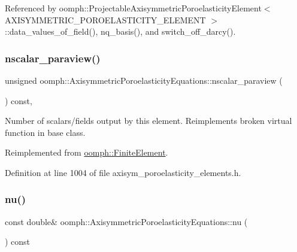 Referenced by oomph\+::\+Projectable\+Axisymmetric\+Poroelasticity\+Element$<$ A\+X\+I\+S\+Y\+M\+M\+E\+T\+R\+I\+C\+\_\+\+P\+O\+R\+O\+E\+L\+A\+S\+T\+I\+C\+I\+T\+Y\+\_\+\+E\+L\+E\+M\+E\+N\+T $>$\+::data\+\_\+values\+\_\+of\+\_\+field(), nq\+\_\+basis(), and switch\+\_\+off\+\_\+darcy().

\mbox{\label{classoomph_1_1AxisymmetricPoroelasticityEquations_a2c1254018631fe41ba7c480303f3503a}} 
\subsubsection{\texorpdfstring{nscalar\+\_\+paraview()}{nscalar\_paraview()}}
{\footnotesize\ttfamily unsigned oomph\+::\+Axisymmetric\+Poroelasticity\+Equations\+::nscalar\+\_\+paraview (\begin{DoxyParamCaption}{ }\end{DoxyParamCaption}) const\hspace{0.3cm}{\ttfamily [inline]}, {\ttfamily [virtual]}}



Number of scalars/fields output by this element. Reimplements broken virtual function in base class. 



Reimplemented from \hyperlink{classoomph_1_1FiniteElement_a865e2e5586552ba80babdbe26a77fe8c}{oomph\+::\+Finite\+Element}.



Definition at line 1004 of file axisym\+\_\+poroelasticity\+\_\+elements.\+h.

\mbox{\label{classoomph_1_1AxisymmetricPoroelasticityEquations_ae031a1a1495cf6fa8b7988462b113d29}} 
\subsubsection{\texorpdfstring{nu()}{nu()}}
{\footnotesize\ttfamily const double\& oomph\+::\+Axisymmetric\+Poroelasticity\+Equations\+::nu (\begin{DoxyParamCaption}{ }\end{DoxyParamCaption}) const\hspace{0.3cm}{\ttfamily [inline]}}



